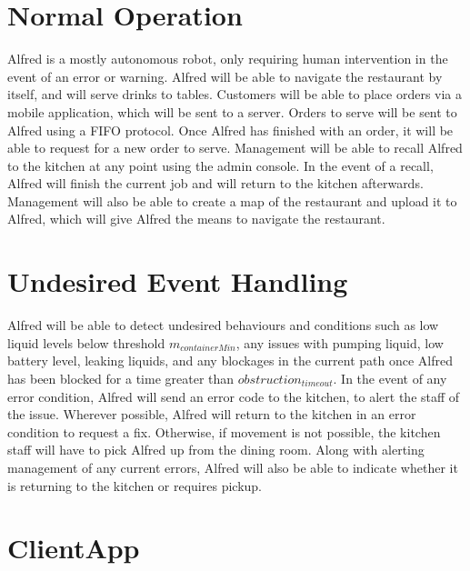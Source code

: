 \documentclass [10pt]{article}
\begin{document}
\section{Normal Operation}
Alfred is a mostly autonomous robot, only requiring human intervention in the event of an error or warning. Alfred will be able to navigate the restaurant by itself, and will serve drinks to tables. Customers will be able to place orders via a mobile application, which will be sent to a server. Orders to serve will be sent to Alfred using a FIFO protocol. Once Alfred has finished with an order, it will be able to request for a new order to serve. Management will be able to recall Alfred to the kitchen at any point using the admin console. In the event of a recall, Alfred will finish the current job and will return to the kitchen afterwards. Management will also be able to create a map of the restaurant and upload it to Alfred, which will give Alfred the means to navigate the restaurant.



\section{Undesired Event Handling}
Alfred will be able to detect undesired behaviours and conditions such as low liquid levels below threshold $ m_{containerMin} $, any issues with pumping liquid, low battery level, leaking liquids, and any blockages in the current path once Alfred has been blocked for a time greater than $ obstruction_{timeout} $. In the event of any error condition, Alfred will send an error code to the kitchen, to alert the staff of the issue. Wherever possible, Alfred will return to the kitchen in an error condition to request a fix. Otherwise, if movement is not possible, the kitchen staff will have to pick Alfred up from the dining room. Along with alerting management of any current errors, Alfred will also be able to indicate whether it is returning to the kitchen or requires pickup.




\section {ClientApp}
\end{document}
